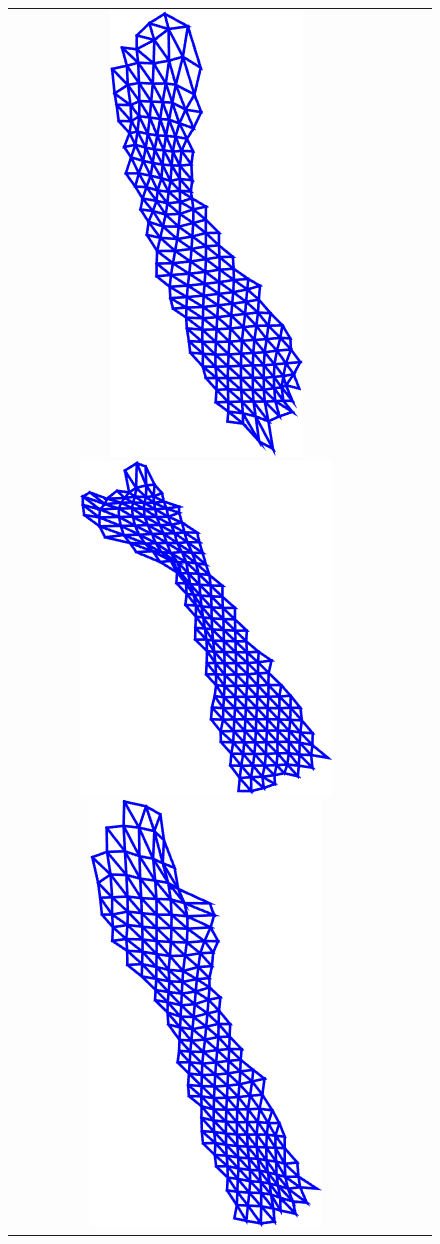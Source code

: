 \begin{figure}[t!]
\begin{center}
\begin{tabular}{ccc}
{    \includegraphics[height=\flowh]{resources/Fig_Flows/3}
    \includegraphics[height=\flowh]{resources/Fig_Flows/4}
    \includegraphics[height=\flowh]{resources/Fig_Flows/5}
}
\end{tabular}
\end{center}
\end{figure}
